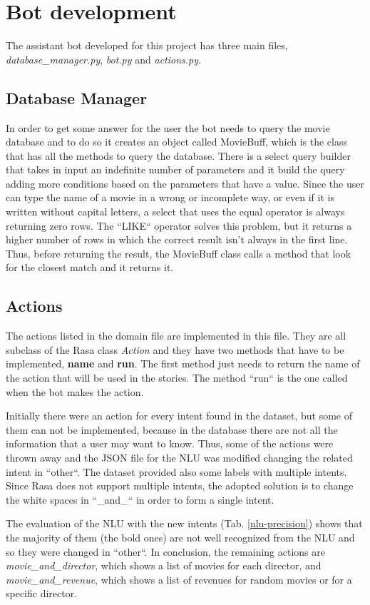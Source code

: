 \documentclass[11pt,a4paper]{article}
\begin{document}
\section{Bot development}
\qquad The assistant bot developed for this project has three main files, \textit{database\_manager.py}, \textit{bot.py} and \textit{actions.py}.
\subsection{Database Manager}
\qquad In order to get some answer for the user the bot needs to query the movie database and to do so it creates an object called MovieBuff, which is the class that has all the methods to query the database. There is a select query builder that takes in input an indefinite number of parameters and it build the query adding more conditions based on the parameters that have a value. Since the user can type the name of a movie in a wrong or incomplete way, or even if it is written without capital letters, a select that uses the equal operator is always returning zero rows. The ``LIKE`` operator solves this problem, but it returns a higher number of rows in which the correct result isn't always in the first line. Thus, before returning the result, the MovieBuff class calls a method that look for the closest match and it returns it.
\subsection{Actions}
\qquad The actions listed in the domain file are implemented in this file. They are all subclass of the Rasa class \textit{Action} and they have two methods that have to be implemented, \textbf{name} and \textbf{run}. The first method just needs to return the name of the action that will be used in the stories. The method ``run`` is the one called when the bot makes the action.

\qquad Initially there were an action for every intent found in the dataset, but some of them can not be implemented, because in the database there are not all the information that a user may want to know. Thus, some of the actions were thrown away and the JSON file for the NLU was modified changing the related intent in ``other``. The dataset provided also some labels with multiple intents. Since Rasa does not support multiple intents, the adopted solution is to change the white spaces in ``\_and\_`` in order to form a single intent.

\qquad The evaluation of the NLU with the new intents (Tab. \ref{nlu-precision}) shows that the majority of them (the bold ones) are not well recognized from the NLU and so they were changed in ``other``. In conclusion, the remaining actions are \textit{movie\_and\_director}, which shows a list of movies for each director, and \textit{movie\_and\_revenue}, which shows a list of revenues for random movies or for a specific director.
\end{document}
